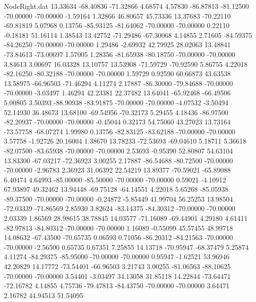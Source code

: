 \begin{filecontents}{NodeRight.dat}
  13.33634  -68.40836  -71.32866     4.68574    4.57830  -86.87813  -81.12500  -70.00000  -70.00000   -1.59164    1.32866   46.80657   45.73336
  13.37683  -70.22110  -69.81819     5.07968    0.13756  -85.93125  -81.64062  -70.00000  -70.00000    0.22110   -0.18181   51.16114    1.38543
  13.42752  -71.29486  -67.30068     4.14855    2.71605  -84.59375  -84.26250  -70.00000  -70.00000    1.29486   -2.69932   42.79925   28.02063
  13.48841  -73.84613  -73.00697     1.57005    1.28356  -81.65938  -80.18750  -70.00000  -70.00000    3.84613    3.00697   16.03328   13.10757
  13.53908  -71.59729  -70.92590     5.86755    4.22018  -82.16250  -80.32188  -70.00000  -70.00000    1.59729    0.92590   60.66873   43.63538
  13.58975  -66.96503  -71.46294     4.11274    2.17887  -86.30000  -79.84688  -70.00000  -70.00000   -3.03497    1.46294   42.23381   22.37482
  13.64041  -65.92468  -66.49506     5.00805    3.50393  -88.90938  -83.91875  -70.00000  -70.00000   -4.07532   -3.50494   52.14930   36.48673
  13.68100  -69.54956  -70.32173     5.29455    4.18436  -86.97500  -82.20937  -70.00000  -70.00000   -0.45044    0.32173   54.75060   43.27023
  13.73164  -73.57758  -68.07274     1.99980    0.13756  -82.83125  -83.62188  -70.00000  -70.00000    3.57758   -1.92726   20.16004    1.38670
  13.78233  -72.53693  -69.04610     5.18711    5.36618  -82.07500  -83.65938  -70.00000  -70.00000    2.53693   -0.95390   52.80807   54.63104
  13.83300  -67.03217  -72.36923     3.00255    2.17887  -86.54688  -80.72500  -70.00000  -70.00000   -2.96783    2.36923   31.06392   22.54219
  13.89377  -70.59021  -65.89088     6.40474    4.64993  -85.00000  -85.50000  -70.00000  -70.00000    0.59021   -4.10912   67.93897   49.32462
  13.94448  -69.75128  -64.14551     4.22018    5.65268  -85.05938  -89.37500  -70.00000  -70.00000   -0.24872   -5.85449   41.99704   56.25253
  13.98504  -72.03339  -71.86569     2.85930    3.82624  -83.14375  -84.30312  -70.00000  -70.00000    2.03339    1.86569   28.98615   38.78845
  14.03577  -71.16089  -69.44901     4.29180    4.61411  -82.97813  -84.80312  -70.00000  -70.00000    1.16089   -0.55099   45.57455   48.99718
  14.08632  -67.43500  -70.65735     0.06593    0.71056  -86.20312  -84.21563  -70.00000  -70.00000   -2.56500    0.65735    0.67351    7.25855
  14.13718  -70.95947  -68.37479     5.25874    4.11274  -84.29375  -85.95000  -70.00000  -70.00000    0.95947   -1.62521   53.96946   42.20829
  14.17772  -73.54401  -66.96503     3.21743    3.00255  -81.06563  -88.10625  -70.00000  -70.00000    3.54401   -3.03497   34.13058   31.85118
  14.22844  -73.64471  -72.16782     4.14855    4.75736  -79.47813  -84.43750  -70.00000  -70.00000    3.64471    2.16782   44.94513   51.54095

\end{filecontents}
